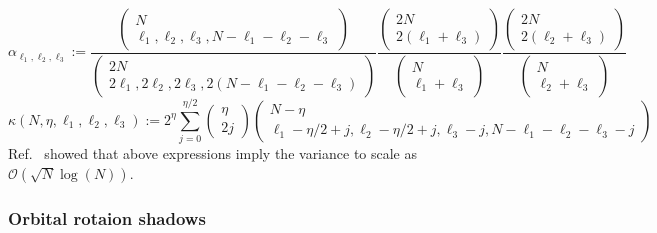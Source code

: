\documentclass[../main.tex]{subfiles}
\begin{document}
\begin{equation}
\alpha_{\ell_1, \ell_2, \ell_3} :=
\frac{\left(\begin{array}{c}
N \\
\ell_1,\ell_2,\ell_3,N-\ell_1-\ell_2-\ell_3
\end{array}\right)}{\left(\begin{array}{c}
2N \\
2\ell_1,2\ell_2,2\ell_3,2\left(N-\ell_1-\ell_2-\ell_3\right)
\end{array}\right)}
    \frac{\left(\begin{array}{c}
2 N \\
2\left(\ell_1+\ell_3\right)
\end{array}\right)}{\left(\begin{array}{c}
N \\
\ell_1+\ell_3
\end{array}\right)} \frac{\left(\begin{array}{c}
2 N \\
2\left(\ell_2+\ell_3\right)
\end{array}\right)}{\left(\begin{array}{c}
N \\
\ell_2+\ell_3
\end{array}\right)}
\end{equation}
\begin{equation}
    \kappa\left(N, \eta, \ell_1, \ell_2, \ell_3\right):=2^\eta \sum_{j=0}^{\eta / 2}\left(\begin{array}{c}
\eta \\
2 j
\end{array}\right)\left(\begin{array}{c}
N-\eta \\
\ell_1-\eta / 2+j, \ell_2-\eta / 2+j, \ell_3-j, N-\ell_1-\ell_2-\ell_3-j
\end{array}\right)
\end{equation}
Ref.~\cite{wan2022matchgate} showed that above expressions imply the variance to scale as  $\mathcal{O}(\sqrt{N}\log(N))$. 

\subsubsection{Orbital rotaion shadows}
\end{document}
